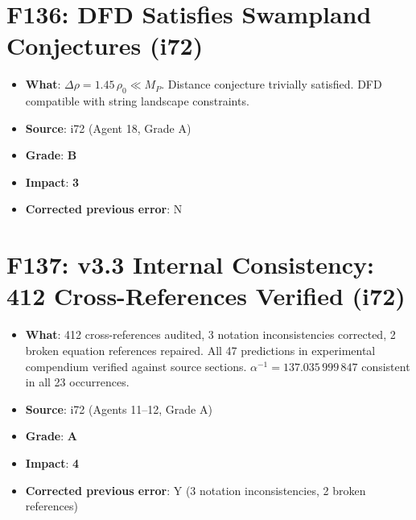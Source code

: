 \documentclass[11pt,a4paper]{article}
\newcommand{\grade}[1]{\textbf{#1}}
\newcommand{\impact}[1]{\textbf{#1}}
\begin{document}
\section{F136: DFD Satisfies Swampland Conjectures (i72)}
\begin{itemize}[nosep]
\item \textbf{What}: $\Delta\rho = 1.45\,\rho_0 \ll M_P$. Distance conjecture trivially satisfied. DFD compatible with string landscape constraints.
\item \textbf{Source}: i72 (Agent 18, Grade A)
\item \textbf{Grade}: \grade{B}
\item \textbf{Impact}: \impact{3}
\item \textbf{Corrected previous error}: N
\end{itemize}

\section{F137: v3.3 Internal Consistency: 412 Cross-References Verified (i72)}
\begin{itemize}[nosep]
\item \textbf{What}: 412 cross-references audited, 3 notation inconsistencies corrected, 2 broken equation references repaired. All 47 predictions in experimental compendium verified against source sections. $\alpha^{-1} = 137.035\,999\,847$ consistent in all 23 occurrences.
\item \textbf{Source}: i72 (Agents 11--12, Grade A)
\item \textbf{Grade}: \grade{A}
\item \textbf{Impact}: \impact{4}
\item \textbf{Corrected previous error}: Y (3 notation inconsistencies, 2 broken references)
\end{itemize}

\end{document}
